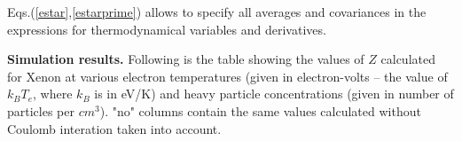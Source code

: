 Eqs.(\ref{estar},\ref{estarprime}) allows to specify all averages and covariances in the 
expressions for thermodynamical variables and derivatives.

{\bf Simulation results.}
Following is the table showing the values of $Z$ calculated for Xenon
at various electron temperatures
(given in electron-volts -- the value of $k_{B}T_{e}$, where $k_{B}$
is in eV/K) and heavy particle concentrations (given in number of
particles per $cm^{3}$). "no" columns contain the same values
calculated without Coulomb interation taken into account.

\begin{center}

\par\end{center}

\clearpage
